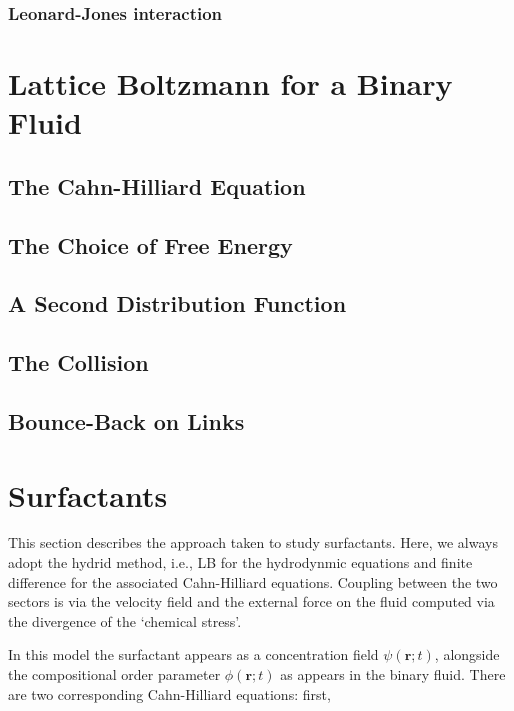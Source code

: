 \subsubsection{Leonard-Jones interaction}



\section{Lattice Boltzmann for a Binary Fluid}

\subsection{The Cahn-Hilliard Equation}

\subsection{The Choice of Free Energy}

\subsection{A Second Distribution Function}

\subsection{The Collision}

\subsection{Bounce-Back on Links}




\section{Surfactants}

This section describes the approach taken to study surfactants. Here,
we always adopt the hydrid method, i.e., LB for the hydrodynmic
equations and finite difference for the associated Cahn-Hilliard
equations. Coupling between the two sectors is via the velocity
field and the external force on the fluid computed via the
divergence of the `chemical stress'.

In this model the surfactant appears as a concentration field
$\psi(\mathbf{r};t)$, alongside the compositional order parameter
$\phi(\mathbf{r};t)$ as appears in the binary fluid. There are
two corresponding Cahn-Hilliard equations: first,

